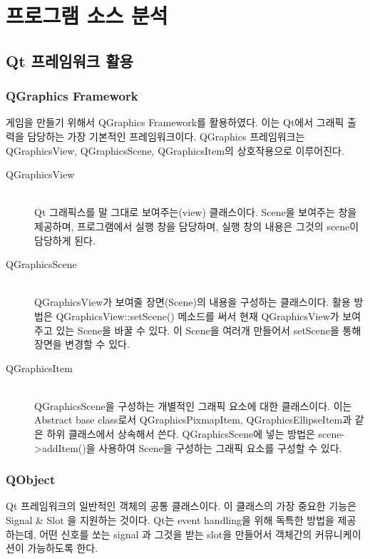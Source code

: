 \documentclass[10pt,oneside,a4paper,titlepage]{article}
\begin{document}
 

\section{프로그램 소스 분석}

\subsection{Qt 프레임워크 활용}

\subsubsection{QGraphics Framework}
게임을 만들기 위해서 QGraphics Framework를 활용하였다. 이는 Qt에서 그래픽 출력을 담당하는 가장 기본적인 프레임워크이다. QGraphics 프레임워크는 QGraphicsView, QGraphicsScene, QGraphicsItem의 상호작용으로 이루어진다. 

\begin{description}
\item[QGraphicsView] \hfill \\
Qt 그래픽스를 말 그대로 보여주는(view) 클래스이다. Scene을 보여주는 창을 제공하며, 프로그램에서 실행 창을 담당하며, 실행 창의 내용은 그것의 scene이 담당하게 된다. 
\item[QGraphicsScene] \hfill \\
QGraphicsView가 보여줄 장면(Scene)의 내용을 구성하는 클래스이다. 활용 방법은 QGraphicsView::setScene() 메소드를 써서 현재 QGraphicsView가 보여주고 있는 Scene을 바꿀 수 있다. 이 Scene을 여러개 만들어서 setScene을 통해 장면을 변경할 수 있다.
\item[QGraphicsItem] \hfill \\
QGraphicsScene을 구성하는 개별적인 그래픽 요소에 대한 클래스이다. 이는 Abstract base class로서 QGraphicsPixmapItem, QGraphicsEllipseItem과 같은 하위 클래스에서 상속해서 쓴다. QGraphicsScene에 넣는 방법은 scene->addItem()을 사용하여 Scene을 구성하는 그래픽 요소를 구성할 수 있다. 
\end{description}

\subsubsection{QObject}

Qt 프레임워크의 일반적인 객체의 공통 클래스이다. 이 클래스의 가장 중요한 기능은 Signal \& Slot 을 지원하는 것이다. Qt는 event handling을 위해 독특한 방법을 제공하는데, 어떤 신호를 쏘는 signal 과 그것을 받는 slot을 만들어서 객체간의 커뮤니케이션이 가능하도록 한다. 
\end{document}

